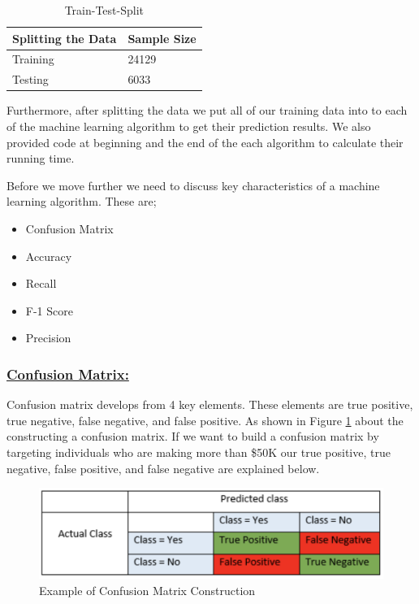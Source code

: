 \documentclass[sigconf]{acmart}
\begin{document}
\begin{table}[!ht]
\centering
\begin{tabular}{|l|l|}
\hline
\textbf{Splitting the Data} & \textbf{Sample Size} \\ \hline
Training                    & 24129                \\ \hline
Testing                     & 6033                 \\ \hline
\end{tabular}
\caption{Train-Test-Split}
\label{split}
\end{table}

\par Furthermore, after splitting the data we put all of our training data into to each of the machine learning algorithm to get their prediction results. We also provided code at beginning and the end of the each algorithm to calculate their running time.

\par Before we move further we need to discuss key characteristics of a machine learning algorithm. These are;

\begin{itemize}
    \item Confusion Matrix
    \item Accuracy
    \item Recall
    \item F-1 Score
    \item Precision 
\end{itemize}

\subsubsection{\textbf{\underline{Confusion Matrix:}}}
Confusion matrix develops from 4 key elements. These elements are true positive, true negative, false negative, and false positive. As shown in Figure \ref{fig:confusion-matrix} about the constructing a confusion matrix. If we want to build a confusion matrix by targeting individuals who are making more than \$50K our true positive, true negative, false positive, and false negative are explained below. 

 \begin{figure}[!ht]
  \centering
      \includegraphics[width=\columnwidth]{project/images/confusion-matrix.png}
  \caption{Example of Confusion Matrix Construction \cite{www-exsilio}}\label{fig:confusion-matrix}
\end{figure}
\end{document}
